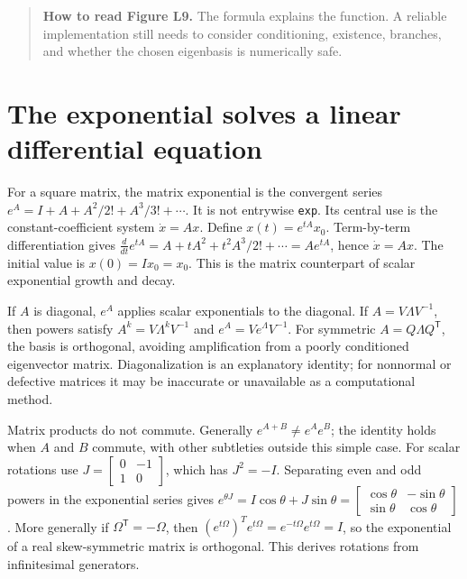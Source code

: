 \begin{quote}
\textbf{How to read Figure L9.} The formula explains the function. A reliable implementation still needs to consider conditioning, existence, branches, and whether the chosen eigenbasis is numerically safe.
\end{quote}

\section{The exponential solves a linear differential equation}\label{02-foundations-ii-ch026-the-exponential-solves-a-linear-differential-equation}

\hypertarget{02-foundations-ii-ch026-the-exponential-solves-a-linear-differential-equation}{}

For a square matrix, the matrix exponential is the convergent series \(e^A=I+A+A^2/2!+A^3/3!+\cdots\). It is not entrywise \texttt{exp}. Its central use is the constant-coefficient system \(\dot x=Ax\). Define \(x(t)=e^{tA}x_0\). Term-by-term differentiation gives \(\frac{d}{dt}e^{tA}=A+ tA^2+t^2A^3/2!+\cdots=Ae^{tA}\), hence \(\dot x=Ax\). The initial value is \(x(0)=Ix_0=x_0\). This is the matrix counterpart of scalar exponential growth and decay.

If \(A\) is diagonal, \(e^A\) applies scalar exponentials to the diagonal. If \(A=V\Lambda V^{-1}\), then powers satisfy \(A^k=V\Lambda^kV^{-1}\) and \(e^A=Ve^\Lambda V^{-1}\). For symmetric \(A=Q\Lambda Q^\mathsf T\), the basis is orthogonal, avoiding amplification from a poorly conditioned eigenvector matrix. Diagonalization is an explanatory identity; for nonnormal or defective matrices it may be inaccurate or unavailable as a computational method.

Matrix products do not commute. Generally \(e^{A+B}\ne e^Ae^B\); the identity holds when \(A\) and \(B\) commute, with other subtleties outside this simple case. For scalar rotations use \(J=\begin{bmatrix}0&-1\\1&0\end{bmatrix}\), which has \(J^2=-I\). Separating even and odd powers in the exponential series gives \(e^{\theta J}=I\cos\theta+J\sin\theta=\begin{bmatrix}\cos\theta&-\sin\theta\\\sin\theta&\cos\theta\end{bmatrix}\). More generally if \(\Omega^\mathsf T=-\Omega\), then \((e^{t\Omega})^Te^{t\Omega}=e^{-t\Omega}e^{t\Omega}=I\), so the exponential of a real skew-symmetric matrix is orthogonal. This derives rotations from infinitesimal generators.

